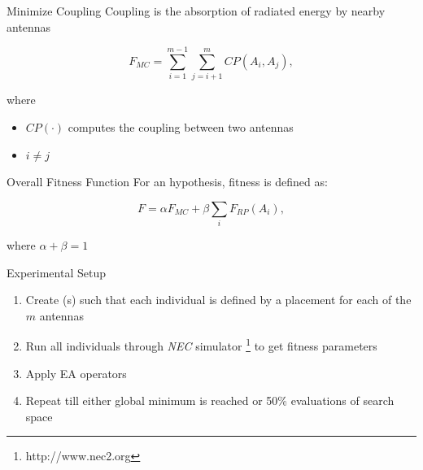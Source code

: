 \documentclass{beamer}
\begin{document}
        \begin{frame}{Minimize Coupling}
            Coupling is the absorption of radiated energy by nearby antennas
            \begin{tcolorbox}[colback=green!5]
                \begin{equation}
                    F_{MC} = \sum_{i=1}^{m-1}\sum_{j=i+1}^{m} CP(A_i, A_j),
                \end{equation}
            \end{tcolorbox}
            where
            \begin{itemize}
                \item $CP(\cdot)$ computes the coupling between two antennas
                \item $i \neq j$
            \end{itemize}
        \end{frame}


        \begin{frame}{Overall Fitness Function}
            For an hypothesis, fitness is defined as:
            \begin{tcolorbox}[colback=green!5]
                \begin{equation} \label{eq:optimal}
                    F = \alpha F_{MC} + \beta \sum_{i} F_{RP}(A_i),
                \end{equation}
            \end{tcolorbox}
            where $\alpha + \beta = 1$
        \end{frame}


        \begin{frame}[t]{Experimental Setup}
            \begin{enumerate}
                \item Create (s) such that each individual is defined by a placement for each of the $m$ antennas
                \item Run all individuals through \textit{NEC} simulator \footnote{http://www.nec2.org} to get fitness parameters 
                \item Apply EA operators 
                \item Repeat till either global minimum is reached or 50\% evaluations of search space
            \end{enumerate}
            \vspace{10mm}
        \end{frame}
\end{document}
